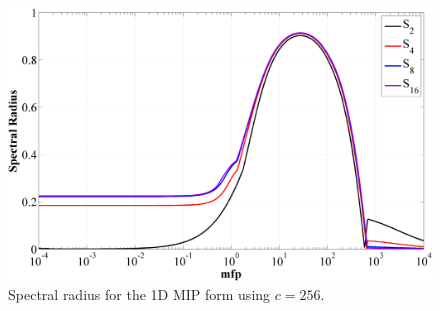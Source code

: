\begin{figure}
\label{fig::1D_MIP_c=256}
\centering
\includegraphics[width=\textwidth]{figures/appendices/DSA_1D_SI_MIP_C=256.png}
\caption{Spectral radius for the 1D MIP form using $c=256$.}
\end{figure}


